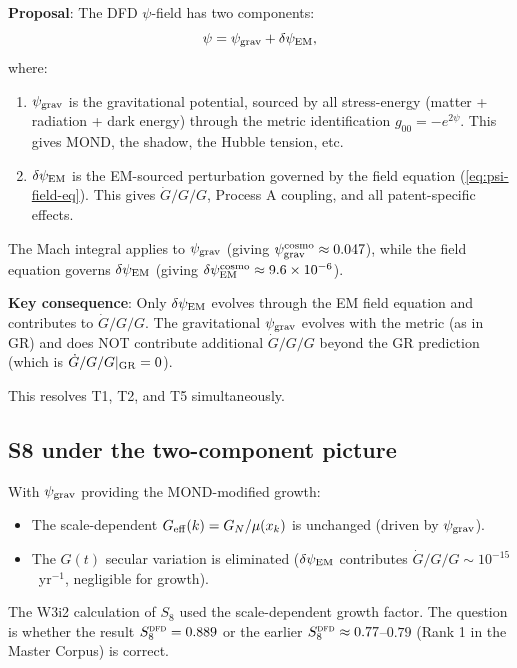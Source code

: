 \documentclass[11pt]{article}
\newcommand{\ee}[1]{\times 10^{#1}}
\newcommand{\GN}{G_N}
\newcommand{\Geff}{G_{\rm eff}}
\newcommand{\Gdot}{\dot{G}/G}
\newcommand{\DFD}{\textsc{dfd}}
\newcommand{\mufd}{\mu}
\begin{document}
\begin{tcolorbox}[colback=blue!5!white, colframe=blue!60!black,
  title=\textbf{W3i5 Structural Resolution: Two-Component $\psi$-Field}]
\textbf{Proposal}: The DFD $\psi$-field has two components:
\begin{equation}
  \psi = \psi_{\rm grav} + \delta\psi_{\rm EM},
\end{equation}
where:
\begin{enumerate}[nosep]
  \item $\psi_{\rm grav}$ is the gravitational potential, sourced by all
    stress-energy (matter + radiation + dark energy) through the metric
    identification $g_{00} = -e^{2\psi}$. This gives MOND, the shadow,
    the Hubble tension, etc.
  \item $\delta\psi_{\rm EM}$ is the EM-sourced perturbation governed by
    the field equation (\ref{eq:psi-field-eq}). This gives
    $\Gdot/G$, Process A coupling, and all patent-specific effects.
\end{enumerate}
The Mach integral applies to $\psi_{\rm grav}$ (giving
$\psi_{\rm grav}^{\rm cosmo} \approx 0.047$), while the field equation
governs $\delta\psi_{\rm EM}$ (giving $\delta\psi_{\rm EM}^{\rm cosmo}
\approx 9.6\ee{-6}$).

\textbf{Key consequence}: Only $\delta\psi_{\rm EM}$ evolves through the
EM field equation and contributes to $\Gdot/G$. The gravitational
$\psi_{\rm grav}$ evolves with the metric (as in GR) and does NOT
contribute additional $\Gdot/G$ beyond the GR prediction (which is
$\Gdot/G|_{\rm GR} = 0$).

This resolves T1, T2, and T5 simultaneously.
\end{tcolorbox}

\subsection{S8 under the two-component picture}

With $\psi_{\rm grav}$ providing the MOND-modified growth:
\begin{itemize}[nosep]
  \item The scale-dependent $\Geff(k) = \GN/\mufd(x_k)$ is unchanged
    (driven by $\psi_{\rm grav}$).
  \item The $G(t)$ secular variation is eliminated ($\delta\psi_{\rm EM}$
    contributes $\Gdot/G \sim 10^{-15}$~yr$^{-1}$, negligible for growth).
\end{itemize}

The W3i2 calculation of $S_8$ used the scale-dependent growth factor.
The question is whether the result $S_8^{\DFD} = 0.889$ or the earlier
$S_8^{\DFD} \approx 0.77$--$0.79$ (Rank 1 in the Master Corpus) is
correct.
\end{document}
